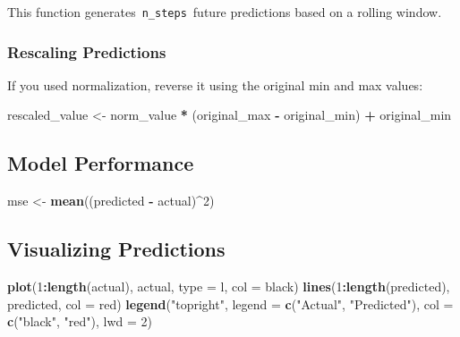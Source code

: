 \documentclass[
]{article}
\newenvironment{Shaded}{\begin{snugshade}}{\end{snugshade}}
\newcommand{\AttributeTok}[1]{\textcolor[rgb]{0.13,0.29,0.53}{#1}}
\newcommand{\DecValTok}[1]{\textcolor[rgb]{0.00,0.00,0.81}{#1}}
\newcommand{\FunctionTok}[1]{\textcolor[rgb]{0.13,0.29,0.53}{\textbf{#1}}}
\newcommand{\NormalTok}[1]{#1}
\newcommand{\OtherTok}[1]{\textcolor[rgb]{0.56,0.35,0.01}{#1}}
\newcommand{\SpecialCharTok}[1]{\textcolor[rgb]{0.81,0.36,0.00}{\textbf{#1}}}
\newcommand{\StringTok}[1]{\textcolor[rgb]{0.31,0.60,0.02}{#1}}
\begin{document}
This function generates~\texttt{n\_steps}~future predictions based on a
rolling window.

\subsubsection{Rescaling Predictions}\label{rescaling-predictions}

If you used normalization, reverse it using the original min and max
values:

\begin{Shaded}
\begin{Highlighting}[]
\NormalTok{rescaled\_value }\OtherTok{\textless{}{-}}\NormalTok{ norm\_value }\SpecialCharTok{*}\NormalTok{ (original\_max }\SpecialCharTok{{-}}\NormalTok{ original\_min) }\SpecialCharTok{+}\NormalTok{ original\_min}
\end{Highlighting}
\end{Shaded}

\subsection{Model Performance}\label{model-performance}

\begin{Shaded}
\begin{Highlighting}[]
\NormalTok{mse }\OtherTok{\textless{}{-}} \FunctionTok{mean}\NormalTok{((predicted }\SpecialCharTok{{-}}\NormalTok{ actual)}\SpecialCharTok{\^{}}\DecValTok{2}\NormalTok{)}
\end{Highlighting}
\end{Shaded}

\subsection{Visualizing Predictions}\label{visualizing-predictions}

\begin{Shaded}
\begin{Highlighting}[]
\FunctionTok{plot}\NormalTok{(}\DecValTok{1}\SpecialCharTok{:}\FunctionTok{length}\NormalTok{(actual), actual, }\AttributeTok{type =} \StringTok{\textquotesingle{}l\textquotesingle{}}\NormalTok{, }\AttributeTok{col =} \StringTok{\textquotesingle{}black\textquotesingle{}}\NormalTok{)}
\FunctionTok{lines}\NormalTok{(}\DecValTok{1}\SpecialCharTok{:}\FunctionTok{length}\NormalTok{(predicted), predicted, }\AttributeTok{col =} \StringTok{\textquotesingle{}red\textquotesingle{}}\NormalTok{)}
\FunctionTok{legend}\NormalTok{(}\StringTok{"topright"}\NormalTok{, }\AttributeTok{legend =} \FunctionTok{c}\NormalTok{(}\StringTok{"Actual"}\NormalTok{, }\StringTok{"Predicted"}\NormalTok{), }\AttributeTok{col =} \FunctionTok{c}\NormalTok{(}\StringTok{"black"}\NormalTok{, }\StringTok{"red"}\NormalTok{), }\AttributeTok{lwd =} \DecValTok{2}\NormalTok{)}
\end{Highlighting}
\end{Shaded}
\end{document}
